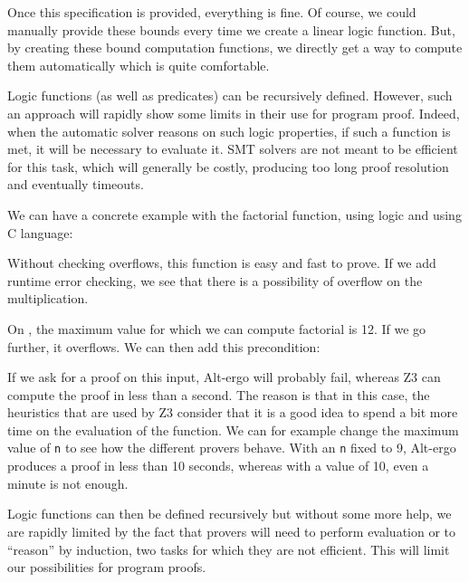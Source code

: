 Once this specification is provided, everything is fine. Of course, we
could manually provide these bounds every time we create a linear logic
function. But, by creating these bound computation functions, we directly
get a way to compute them automatically which is quite comfortable.





Logic functions (as well as predicates) can be recursively defined.
However, such an approach will rapidly show some limits in their use for
program proof. Indeed, when the automatic solver reasons on such logic
properties, if such a function is met, it will be necessary to evaluate it.
SMT solvers are not meant to be efficient for this task, which will generally
be costly, producing too long proof resolution and eventually timeouts.

We can have a concrete example with the factorial function, using logic
and using C language:






Without checking overflows, this function is easy and fast to prove. If
we add runtime error checking, we see that there is a possibility of
overflow on the multiplication.



On , the maximum value for which we can compute
factorial is 12. If we go further, it overflows. We can then add this
precondition:






If we ask for a proof on this input, Alt-ergo will probably fail,
whereas Z3 can compute the proof in less than a second. The reason is
that in this case, the heuristics that are used by Z3 consider that it
is a good idea to spend a bit more time on the evaluation of the
function. We can for example change the maximum value of \texttt{n} to
see how the different provers behave. With an \texttt{n} fixed to 9,
Alt-ergo produces a proof in less than 10 seconds, whereas with a value
of 10, even a minute is not enough.



Logic functions can then be defined recursively but without some more
help, we are rapidly limited by the fact that provers will need to
perform evaluation or to ``reason'' by induction, two tasks for which
they are not efficient. This will limit our possibilities for program
proofs.
